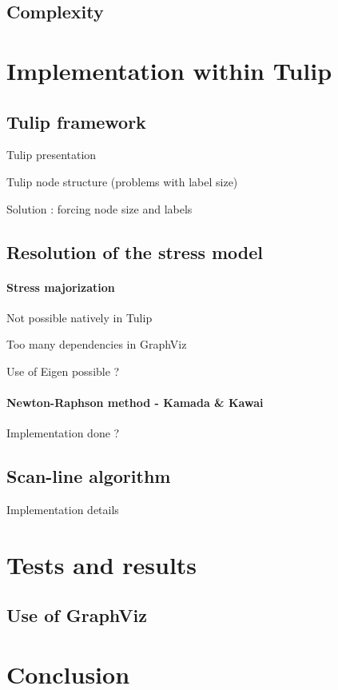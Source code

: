 \documentclass[12pt]{report}
\begin{document}
\section{Complexity}

\chapter{Implementation within Tulip}

\section{Tulip framework}

Tulip presentation

Tulip node structure (problems with label size)

Solution : forcing node size and labels

\section{Resolution of the stress model}
\subsubsection{Stress majorization}
Not possible natively in Tulip

Too many dependencies in GraphViz

Use of Eigen possible ?
\subsubsection{Newton-Raphson method - Kamada \& Kawai}
Implementation done ?
\section{Scan-line algorithm}
Implementation details
\chapter{Tests and results}

\section{Use of GraphViz}

\chapter{Conclusion}



\end{document}
